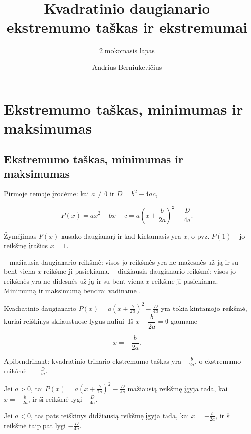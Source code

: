 \documentclass[11pt,a4paper]{scrartcl}
\title{Kvadratinio daugianario ekstremumo taškas ir ekstremumai}
\subtitle{2 mokomasis lapas}
\author{Andrius Berniukevičius}
\numberwithin{exercise}{section}
\begin{document}
\maketitle

\vspace{-1cm}

\section{Ekstremumo taškas, minimumas ir maksimumas}

\subsection{Ekstremumo taškas, minimumas ir maksimumas}

Pirmoje temoje įrodėme: kai $a\ne0$ ir $D=b^2-4ac$,

\[P(x)=ax^2+bx+c=a\left(x+\frac{b}{2a}\right)^2-\frac{D}{4a}.\]

Žymėjimas $P(x)$ nusako daugianarį ir kad kintamasis yra $x$, o pvz. $P(1)$ -- jo reikšmę įrašius $x=1$. 

\begin{definition}\label{ap:ekstremumai}

 -- mažiausia daugianario reikšmė: visos jo reikšmės yra ne mažesnės už ją ir su bent viena $x$ reikšme ji pasiekiama.  -- didžiausia daugianario reikšmė: visos jo reikšmės yra ne didesnės už ją ir su bent viena $x$ reikšme ji pasiekiama. Minimumą ir maksimumą bendrai vadiname .

\end{definition}

\begin{definition}\label{ap:ekstremumo_taskas}

Kvadratinio daugianario $P(x)=a\left(x+\frac{b}{2a}\right)^2-\frac{D}{4a}$  yra tokia kintamojo reikšmė, kuriai reiškinys skliaustuose lygus nuliui. Iš $x+\dfrac{b}{2a}=0$ gauname

\[
\boxed{x=-\frac{b}{2a}}.
\]

Apibendrinant: kvadratinio trinario ekstremumo taškas yra $-\frac{b}{2a}$, o ekstremumo reikšmė -- $-\frac{D}{4a}$.

\end{definition}

\begin{theorem}\label{th:ekstremumai}

Jei $a>0$, tai $P(x)=a\left(x+\frac{b}{2a}\right)^2-\frac{D}{4a}$ mažiausią reikšmę įgyja tada, kai $x=-\frac{b}{2a}$, ir ši reikšmė lygi $-\frac{D}{4a}$.

Jei $a<0$, tas pats reiškinys didžiausią reikšmę įgyja tada, kai
$x=-\frac{b}{2a}$, ir ši reikšmė taip pat lygi $-\frac{D}{4a}$.

\end{theorem}
\end{document}
